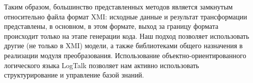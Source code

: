 \documentclass[conference]{IEEEtran} \IEEEoverridecommandlockouts
\begin{document}
Таким образом, большинство представленных методов является замкнутым относительно файла формат XMI: исходные данные и результат трансформации представлены, в основном, в этом формате, выход за границу формата происходит только на этапе генерации кода. Наш подход позволяет использовать другие (не только в XMI) модели, а также библиотеками общего назначения в реализации модуля преобразования. Использование объектно-ориентированного логического языка LogTalk позволяет нам активно использовать структурирование и управление базой знаний.
\end{document}

